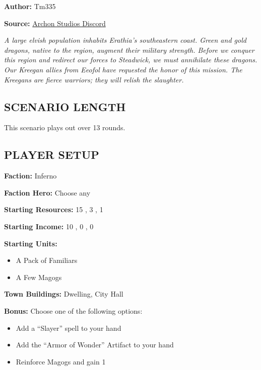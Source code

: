 \cleardoublepage{}

\begin{multicols*}{2}

\textbf{Author:} Tm335

\textbf{Source:} \href{https://discord.com/channels/740870068178649108/1243057664666238996/1243057664666238996}{Archon Studios Discord}

\textit{A large elvish population inhabits Erathia's southeastern coast.
Green and gold dragons, native to the region, augment their military strength.
Before we conquer this region and redirect our forces to Steadwick, we must annihilate these dragons.
Our Kreegan allies from Eeofol have requested the honor of this mission.
The Kreegans are fierce warriors; they will relish the slaughter.}

\subsection*{\MakeUppercase{Scenario length}}

This scenario plays out over 13 rounds.

\subsection*{\MakeUppercase{Player setup}}

\textbf{Faction:} Inferno

\textbf{Faction Hero:} Choose any

\textbf{Starting Resources:} 15 , 3 , 1 

\textbf{Starting Income:} 10 , 0 , 0 

\textbf{Starting Units:}

\begin{itemize}
  \item A Pack of Familiars
  \item A Few Magogs
\end{itemize}

\textbf{Town Buildings:}  Dwelling, City Hall

\textbf{Bonus:} Choose one of the following options:
\begin{itemize}
  \item Add a ``Slayer'' spell to your hand
  \item Add the ``Armor of Wonder'' Artifact to your hand
  \item Reinforce Magogs and gain 1 
\end{itemize}


\end{multicols*}
